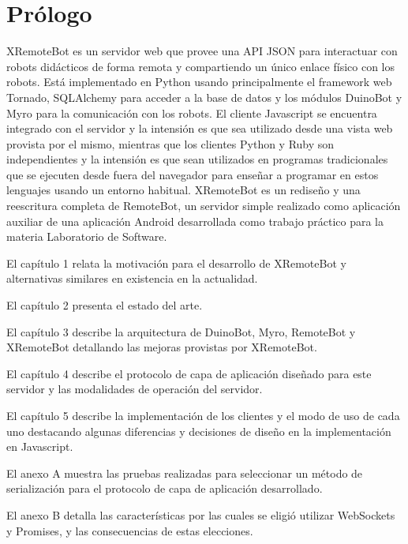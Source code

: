 \chapter*{Prólogo}\label{prologo}

XRemoteBot es un servidor web que provee una API JSON para interactuar
con robots didácticos de forma remota y compartiendo un único enlace
físico con los robots. Está implementado en Python usando principalmente el
framework web Tornado, SQLAlchemy para acceder a la base de datos
y los módulos DuinoBot y Myro para
la comunicación con los robots. El cliente Javascript se encuentra
integrado con el servidor y la intensión es que sea utilizado desde una
vista web provista por el mismo, mientras que los clientes Python y Ruby
son independientes y la intensión es que sean utilizados en programas
tradicionales que se ejecuten desde fuera del navegador para enseñar
a programar en estos lenguajes usando un entorno habitual. XRemoteBot
es un rediseño y una reescritura completa de RemoteBot, un servidor
simple realizado como aplicación auxiliar de una aplicación Android
desarrollada
como trabajo práctico para la materia Laboratorio de Software.

El capítulo 1 relata la motivación para el desarrollo de XRemoteBot
y alternativas similares en existencia en la actualidad.

El capítulo 2 presenta el estado del arte.

El capítulo 3 describe la arquitectura de DuinoBot, Myro, RemoteBot y
XRemoteBot detallando las mejoras provistas por XRemoteBot.

El capítulo 4 describe el protocolo de capa de aplicación diseñado para
este servidor y las modalidades de operación del servidor.

El capítulo 5 describe la implementación de los clientes y el modo de uso
de cada uno destacando algunas diferencias y decisiones de diseño en la
implementación en Javascript.

El anexo A muestra las pruebas realizadas para seleccionar un método
de serialización para el protocolo de capa de aplicación desarrollado.

El anexo B detalla las características por las cuales se eligió utilizar
WebSockets y Promises, y las consecuencias de estas elecciones.

